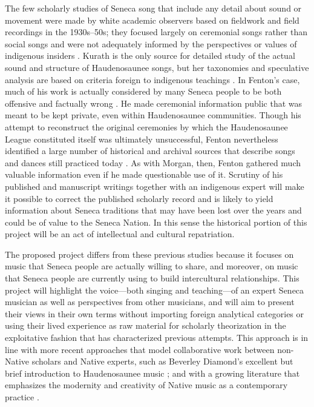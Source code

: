 \documentclass{neh}
\begin{document}
The few scholarly studies of Seneca song that include any detail about sound or
movement were made by white academic observers based on fieldwork and field
recordings in the 1930s--50s; they focused largely on ceremonial songs rather
than social songs and were not adequately informed by the perspectives or
values of indigenous insiders
\Autocites{FentonKurath:EagleDance}{Kurath:IroquoisMusic}.
Kurath is the only source for detailed study of the actual sound and structure
of Haudenosaunee songs, but her taxonomies and speculative analysis are based
on criteria foreign to indigenous teachings
\Autocite{Caldwell:Kurath}.
In Fenton's case, much of his work is actually considered by many Seneca
people to be both offensive and factually wrong
\Autocite{McCarthy:Iroquoianist}.
He made ceremonial information public that was meant to be kept private, even
within Haudenosaunee communities.
Though his attempt to reconstruct the original ceremonies by which the
Haudenosaunee League constituted itself was ultimately unsuccessful, Fenton
nevertheless identified a large number of historical and archival sources that
describe songs and dances still practiced today
\Autocites{Fenton:GreatLaw}.
As with Morgan, then, Fenton gathered much valuable information even if he
made questionable use of it.
Scrutiny of his published and manuscript writings together with an indigenous
expert will make it possible to correct the published scholarly record and is
likely to yield information about Seneca traditions that may have been lost
over the years and could be of value to the Seneca Nation.
In this sense the historical portion of this project will be an act of
intellectual and cultural repatriation.

The proposed project differs from these previous studies because it focuses on
music that Seneca people are actually willing to share, and moreover, on music
that Seneca people are currently using to build intercultural relationships.
This project will highlight the voice---both singing and teaching---of an
expert Seneca musician as well as perspectives from other musicians, and will
aim to present their views in their own terms without importing foreign
analytical categories or using their lived experience as raw material for
scholarly theorization in the exploitative fashion that has characterized
previous attempts.
This approach is in line with more recent approaches that model collaborative
work between non-Native scholars and Native experts, such as Beverley
Diamond's excellent but brief introduction to Haudenosaunee music 
\Autocite{Diamond:NativeAmericanNortheast}; 
and with a growing literature that emphasizes the modernity and creativity of
Native music as a contemporary practice
\Autocites
{Browner:FirstNations}
{Browner:Heartbeat}
{LevineRobinson:MusicModernity}.
\end{document}
